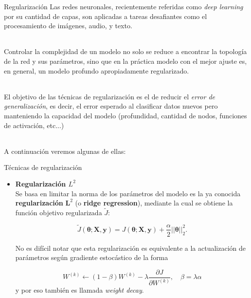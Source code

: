 \documentclass[handout, 9pt]{beamer}
\begin{document}
\begin{frame}{Regularización}
Las redes neuronales, recientemente referidas como \textit{deep learning} por su cantidad de capas, son aplicadas a tareas desafiantes como el procesamiento de imágenes, audio, y texto. \\~\

Controlar la complejidad de un modelo no solo se reduce a encontrar la topología de la red y sus parámetros, sino que en la práctica  modelo con el mejor ajuste es, en general, un modelo profundo apropiadamente regularizado. \\~\

El objetivo de las técnicas de regularización es el de reducir el \textit{error de generalización}, es decir, el error esperado al clasificar datos nuevos pero manteniendo la capacidad del modelo (profundidad, cantidad de nodos, funciones de activación, etc...) \\~\ 

A continuación veremos algunas de ellas: 


\end{frame}


\begin{frame}{Técnicas de regularización}

\begin{itemize}
  \item \textbf{Regularización $L^2$} \\ \pause
  Se basa en limitar la norma de los parámetros del modelo es la ya conocida \textbf{regularización} $\bm{L}^{2}$ (o \textbf{ridge regression}), mediante la cual se obtiene la función objetivo regularizada $\tilde{J}$: \pause

  \begin{equation*}
  \tilde{J}(\bm{\theta};\bm{X},\bm{y}) = J(\bm{\theta};\bm{X},\bm{y}) + \frac{\alpha}{2}||\bm{\theta}||^{2}_{2}.
  \end{equation*} \pause

  No es difícil notar que esta regularización es equivalente a la actualización de parámetros según gradiente estocástico de la forma \pause

  \begin{equation*}
  W^{(k)} \gets (1-\beta) W^{(k)} - \lambda \frac{\partial J}{\partial W^{(k)}}, \quad \beta = \lambda \alpha
  \end{equation*}
  y por eso también es llamada \textit{weight decay}.

\end{itemize}

\end{frame}
\end{document}

